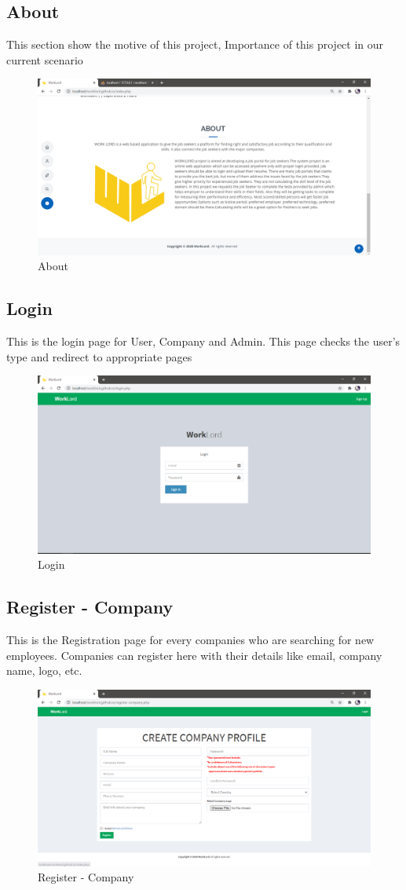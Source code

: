 \documentclass[a4paper,12pt]{report}
\begin{document}
\subsection {About}
This section show the motive of this project, Importance of this project in our current scenario
\begin{figure}[bph]
	\centering
	\includegraphics[width=.7\linewidth ]{img/screenshots/about}
	\caption{About}
\end{figure}

\subsection {Login}
This is the login page for User, Company and Admin. This page checks the user's type and redirect to appropriate pages
\begin{figure}[bph]
	\centering
	\includegraphics[width=.7\linewidth ]{img/screenshots/login}
	\caption{Login}
\end{figure}

\pagebreak

\subsection {Register - Company}
This is the Registration page for every companies who are searching for new employees. Companies can register here with their details like email, company name, logo, etc.
\begin{figure}[bph]
	\centering
	\includegraphics[width=.7\linewidth ]{img/screenshots/comp_reg}
	\caption{Register - Company}
\end{figure}
\end{document}
